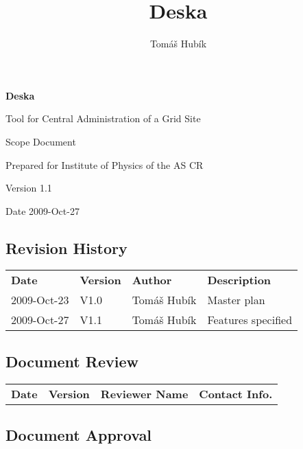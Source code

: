 \documentclass[12pt]{article}
\author{Tomáš Hubík}
\title{Deska}
\begin{document}
{\Huge \textbf{Deska}}

\vspace{0.2in}

{\large Tool for Central Administration of a Grid Site}

\vspace{0.5in}

{\large Scope Document}

\vspace{0.2in}

{\large Prepared for Institute of Physics of the AS CR}

\vspace{0.2in}

{\large Version 1.1}

\vspace{0.2in}

{\large Date 2009-Oct-27}

\vspace{0.5in}

\subsection*{Revision History}

\begin{table}[!h]
	\begin{tabular}{l l l l}
		\textbf{Date} & \textbf{Version} & \textbf{Author} & \textbf{Description} \\
		2009-Oct-23 & V1.0 & Tomáš Hubík & Master plan \\
		2009-Oct-27 & V1.1 & Tomáš Hubík & Features specified \\
	\end{tabular}
	\label{tab:RevisionHistory}
\end{table}


\subsection*{Document Review}

\begin{table}[!h]
	\begin{tabular}{l l l l}
		\textbf{Date} & \textbf{Version} & \textbf{Reviewer Name} & \textbf{Contact Info.} \\
	\end{tabular}
	\label{tab:DocumentReview}
\end{table}


\subsection*{Document Approval}
\end{document}
